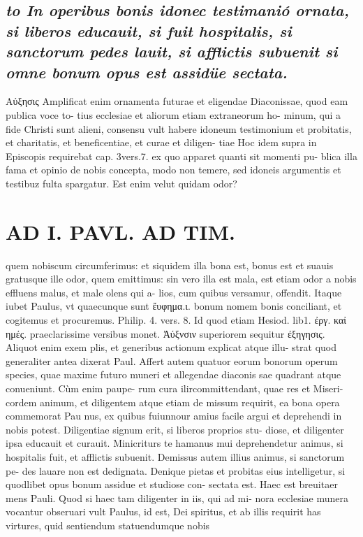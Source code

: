 \documentclass{article}
\begin{document}
\begin{pages}
\subsection*{\textit{to In operibus bonis idonec testimanió ornata, si liberos educauit, si fuit hospitalis, si sanctorum pedes lauit, si afflictis subuenit si omne bonum opus est assidüe sectata. }}\pstart Αύξησις Amplificat enim ornamenta futurae et eligendae Diaconissae, quod eam publica voce to- tius ecclesiae et aliorum etiam extraneorum ho- minum, qui a fide Christi sunt alieni, consensu vult habere idoneum testimonium et probitatis, et charitatis, et beneficentiae, et curae et diligen- tiae Hoc idem supra in Episcopis requirebat cap. 3vers.7. ex quo apparet quanti sit momenti pu- blica illa fama et opinio de nobis concepta, modo non temere, sed idoneis argumentis et testibuz fulta spargatur. Est enim velut quidam odor?  \pend
\section*{AD I. PAVL. AD TIM. }
\marginpar{[ p.270 ]}\pstart quem nobiscum circumferimus: et siquidem illa bona est, bonus est et suauis gratusque ille odor, quem emittimus: sin vero illa est mala, est etiam odor a nobis effluens malus, et male olens qui a- lios, cum quibus versamur, offendit. Itaque iubet Paulus, vt quaecunque sunt ἔυφημα.ι. bonum nomem bonis conciliant, et cogitemus et procuremus. Philip. 4. vers. 8. Id quod etiam Hesiod. lib1. ἐργ. καἰ ημές. praeclarissime versibus monet. Ἀύξνσιν superiorem sequitur ἐξηγησις. Aliquot enim exem plis, et generibus actionum explicat atque illu- strat quod generaliter antea dixerat Paul. Affert autem quatuor eorum bonorum operum species, quae maxime futuro muneri et allegendae diaconis sae quadrant atque conueniunt. Cùm enim paupe- rum cura ilircommittendant, quae res et Miseri- cordem animum, et diligentem atque etiam de missum requirit, ea bona opera commemorat Pau nus, ex quibus fuiunnour amius facile argui et deprehendi in nobis potest.  \pend\pstart Diligentiae signum erit, si liberos proprios stu- diose, et diligenter ipsa educauit et curauit.   \pend\pstart Minicriturs te hamanus mui deprehendetur animus, si hospitalis fuit, et afflictis subuenit.  \pend\pstart Demissus autem illius animus, si sanctorum pe- des lauare non est dedignata.  \pend\pstart Denique pietas et probitas eius intelligetur, si quodlibet opus bonum assidue et studiose con- sectata est. Haec est breuitaer mens Pauli.  \pend\pstart Quod si haec tam diligenter in iis, qui ad mi- nora ecclesiae munera vocantur obseruari vult Paulus, id est, Dei spiritus, et ab illis requirit has virtures, quid sentiendum statuendumque nobis  \pend

\end{pages}
\end{document}
